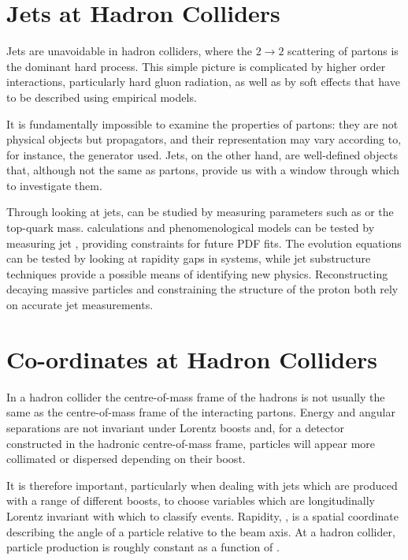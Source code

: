 \section{Jets at Hadron Colliders}
\label{sec:bg-theory:jets_in_hadron_colliders}
Jets are unavoidable in hadron colliders, where the \QCD $2 \rightarrow 2$ scattering of partons is the dominant hard process.
This simple picture is complicated by higher order \QCD interactions, particularly hard gluon radiation, as well as by soft \QCD effects that have to be described using empirical models.

It is fundamentally impossible to examine the properties of partons: they are not physical objects but propagators, and their representation may vary according to, for instance, the \MC generator used.
Jets, on the other hand, are well-defined objects that, although not the same as partons, provide us with a window through which to investigate them.

Through looking at jets, \QCD can be studied by measuring parameters such as \alphaS or the top-quark mass.
\QCD calculations and phenomenological \MC models can be tested by measuring jet , providing constraints for future PDF fits.
The \QCD evolution equations can be tested by looking at rapidity gaps in \dijet systems, while jet substructure techniques provide a possible means of
identifying new physics.
Reconstructing decaying massive particles and constraining the structure of the proton both rely on accurate jet measurements.

\section{Co-ordinates at Hadron Colliders}
\label{sec:bg-theory:coordinates}
In a hadron collider the centre-of-mass frame of the hadrons is not usually the same as the centre-of-mass frame of the interacting partons.
Energy and angular separations are not invariant under Lorentz boosts and, for a detector constructed in the hadronic centre-of-mass frame, particles will appear more collimated or dispersed depending on their boost.

It is therefore important, particularly when dealing with jets which are produced with a range of different boosts, to choose variables which are longitudinally Lorentz invariant with which to classify events.
Rapidity, \rap, is a spatial coordinate describing the angle of a particle relative to the beam axis.
At a hadron collider, particle production is roughly constant as a function of \rap.

